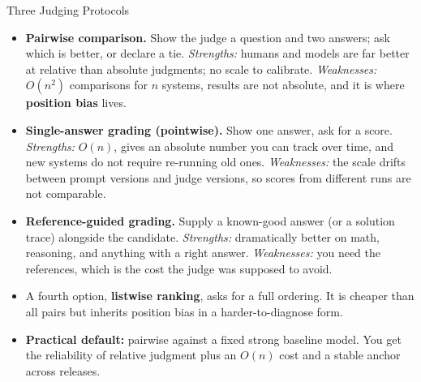 \begin{frame}{Three Judging Protocols}
  \begin{itemize}\footnotesize\itemsep0.3em
    \item[\textcolor{red}{$\blacktriangleright$}] \textbf{Pairwise comparison.} Show the judge a question and two answers; ask which is better, or declare a tie. \textit{Strengths:} humans and models are far better at relative than absolute judgments; no scale to calibrate. \textit{Weaknesses:} $O(n^2)$ comparisons for $n$ systems, results are not absolute, and it is where \textbf{position bias} lives.
    \item[\textcolor{red}{$\blacktriangleright$}] \textbf{Single-answer grading (pointwise).} Show one answer, ask for a score. \textit{Strengths:} $O(n)$, gives an absolute number you can track over time, and new systems do not require re-running old ones. \textit{Weaknesses:} the scale drifts between prompt versions and judge versions, so scores from different runs are not comparable.
    \item[\textcolor{red}{$\blacktriangleright$}] \textbf{Reference-guided grading.} Supply a known-good answer (or a solution trace) alongside the candidate. \textit{Strengths:} dramatically better on math, reasoning, and anything with a right answer. \textit{Weaknesses:} you need the references, which is the cost the judge was supposed to avoid.
    \item[\textcolor{red}{$\blacktriangleright$}] A fourth option, \textbf{listwise ranking}, asks for a full ordering. It is cheaper than all pairs but inherits position bias in a harder-to-diagnose form.
    \item[\textcolor{red}{$\blacktriangleright$}] \textbf{Practical default:} pairwise against a fixed strong baseline model. You get the reliability of relative judgment plus an $O(n)$ cost and a stable anchor across releases.
  \end{itemize}
\end{frame}

